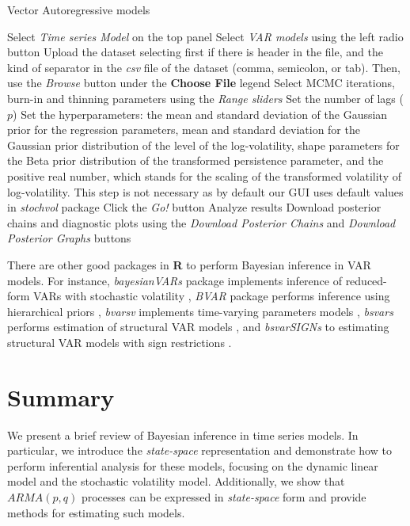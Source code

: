 \begin{algorithm}[h!]
	\caption{Vector Autoregressive models}\label{alg:VAR}
	\begin{algorithmic}[1]  		 			
		\State Select \textit{Time series Model} on the top panel
		\State Select \textit{VAR models} using the left radio button
		\State Upload the dataset selecting first if there is header in the file, and the kind of separator in the \textit{csv} file of the dataset (comma, semicolon, or tab). Then, use the \textit{Browse} button under the \textbf{Choose File} legend
		\State Select MCMC iterations, burn-in and thinning parameters using the \textit{Range sliders}
		\State Set the number of lags ($p$)
		\State Set the hyperparameters: the mean and standard deviation of the Gaussian prior for the regression parameters, mean and standard deviation for the Gaussian prior distribution of the level of the log-volatility, shape parameters for the Beta prior distribution of the transformed persistence parameter, and the positive real number, which stands for the scaling of the transformed volatility of log-volatility. This step is not necessary as by default our GUI uses default values in \textit{stochvol} package
		\State Click the \textit{Go!} button
		\State Analyze results
		\State Download posterior chains and diagnostic plots using the \textit{Download Posterior Chains} and \textit{Download Posterior Graphs} buttons
	\end{algorithmic} 
\end{algorithm}



There are other good packages in \textbf{R} to perform Bayesian inference in VAR models. For instance, \textit{bayesianVARs} package implements inference of reduced-form VARs with stochastic volatility \cite{Gruber2024}, \textit{BVAR} package performs inference using hierarchical priors \cite{Kuschnig2024}, \textit{bvarsv} implements time-varying parameters models \cite{Krueger2022}, \textit{bsvars} performs estimation of structural VAR models \cite{Tomasz2024}, and \textit{bsvarSIGNs} to estimating structural VAR models with sign restrictions \cite{Wang2024}. 
 
\section{Summary}\label{sec85}
We present a brief review of Bayesian inference in time series models. In particular, we introduce the \textit{state-space} representation and demonstrate how to perform inferential analysis for these models, focusing on the dynamic linear model and the stochastic volatility model. Additionally, we show that $ARMA(p,q)$ processes can be expressed in \textit{state-space} form and provide methods for estimating such models. 

